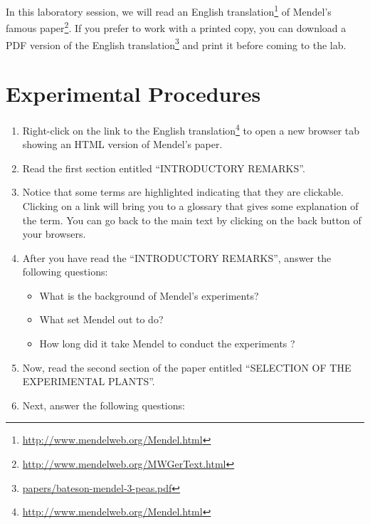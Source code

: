\documentclass[]{book}
\providecommand{\tightlist}{%
  \setlength{\itemsep}{0pt}\setlength{\parskip}{0pt}}
\let\rmarkdownfootnote\footnote%
\def\footnote{\protect\rmarkdownfootnote}
\renewcommand{\href}[2]{#2\footnote{\url{#1}}}
\theoremstyle{definition}
\theoremstyle{definition}
\theoremstyle{definition}
\theoremstyle{remark}
\begin{document}
In this laboratory session, we will read an
\href{http://www.mendelweb.org/Mendel.html}{English translation} of
\href{http://www.mendelweb.org/MWGerText.html}{Mendel's famous paper}.
If you prefer to work with a printed copy, you can download a
\href{papers/bateson-mendel-3-peas.pdf}{PDF version of the English
translation} and print it before coming to the lab.

\section{Experimental Procedures}\label{experimental-procedures-2}

\begin{enumerate}
\def\labelenumi{\arabic{enumi}.}
\tightlist
\item
  Right-click on the link to the
  \href{http://www.mendelweb.org/Mendel.html}{English translation} to
  open a new browser tab showing an HTML version of Mendel's paper.
\item
  Read the first section entitled ``INTRODUCTORY REMARKS''.
\item
  Notice that some terms are highlighted indicating that they are
  clickable. Clicking on a link will bring you to a glossary that gives
  some explanation of the term. You can go back to the main text by
  clicking on the back button of your browsers.
\item
  After you have read the ``INTRODUCTORY REMARKS'', answer the following
  questions:

  \begin{itemize}
  \tightlist
  \item
    What is the background of Mendel's experiments?
  \item
    What set Mendel out to do?
  \item
    How long did it take Mendel to conduct the experiments ?
  \end{itemize}
\item
  Now, read the second section of the paper entitled ``SELECTION OF THE
  EXPERIMENTAL PLANTS''.
\item
  Next, answer the following questions:


\end{enumerate}
\end{document}
